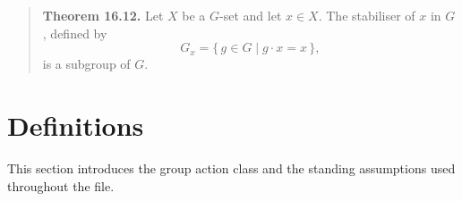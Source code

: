 \documentclass[
  12pt, %
]{assignment}
\begin{document}
\begin{quote}
	\textbf{Theorem 16.12.}
	Let $X$ be a $G$-set and let $x \in X$. The stabiliser of $x$ in $G$, defined by
	\[
		G_x = \{\, g \in G \mid g \cdot x = x \,\},
	\]
	is a subgroup of $G$.
\end{quote}

\section{Definitions}
This section introduces the group action class and the standing assumptions used
throughout the file.
\end{document}
